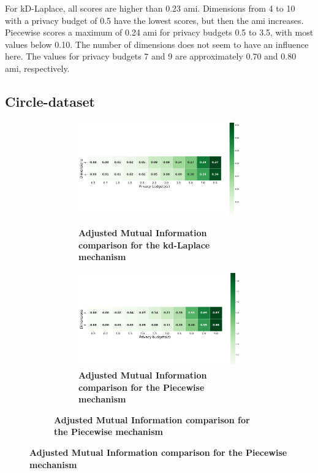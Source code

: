 For kD-Laplace, all scores are higher than 0.23 \gls{ami}.
Dimensions from 4 to 10 with a privacy budget of 0.5 have the lowest scores, but then the \gls{ami} increases.
Piecewise scores a maximum of 0.24 \gls{ami} for privacy budgets 0.5 to 3.5, with most values below 0.10. The number of dimensions does not seem to have an influence here.
The values for privacy budgets 7 and 9 are approximately 0.70 and 0.80 \gls{ami}, respectively.
\newpage
\subsection{Circle-dataset}
\begin{figure}[H]
  \centering
  \begin{subfigure}[b]{0.85\textwidth}
    \begin{subfigure}[c]{1\textwidth}
      \caption{\textbf{Adjusted Mutual Information comparison for the kd-Laplace mechanism}}
      \includegraphics[width=1\textwidth]{Results/kd-laplace/kd-Laplace/circle-dataset/ami.png}
      \label{fig:ami_circle-dataset_comparison_kdlaplace_2d}
    \end{subfigure}
    \vfill %
    \begin{subfigure}[c]{1\textwidth}
      \caption{\textbf{Adjusted Mutual Information comparison for the Piecewise mechanism}}
      \includegraphics[width=1\textwidth]{Results/kd-laplace/piecewise/circle-dataset/ami.png}

\end{subfigure}
\end{subfigure}
\end{figure}

